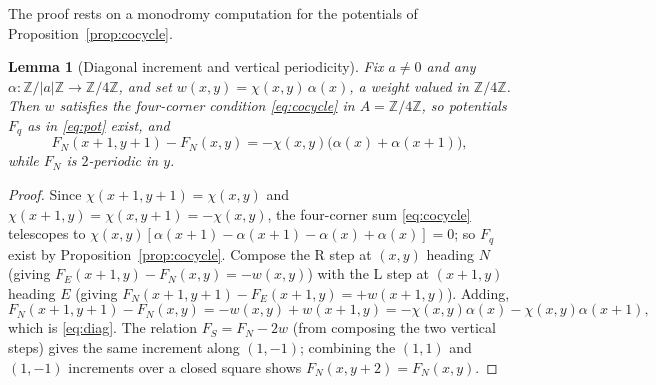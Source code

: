 \documentclass[11pt,reqno]{amsart}
\theoremstyle{plain}
\newtheorem{lemma}[theorem]{Lemma}
\theoremstyle{definition}
\newcommand{\Z}{\mathbb{Z}}
\newcommand{\che}{\chi}
\newcommand{\turnR}{\mathrm{R}}
\newcommand{\turnL}{\mathrm{L}}
\begin{document}
The proof rests on a monodromy computation for the potentials of
Proposition~\ref{prop:cocycle}.

\begin{lemma}[Diagonal increment and vertical periodicity]\label{lem:diag}
Fix $a\neq0$ and any $\alpha:\Z/|a|\Z\to\Z/4\Z$, and set $w(x,y)=\che(x,y)\,\alpha(x)$,
a weight valued in $\Z/4\Z$. Then $w$ satisfies the four-corner condition
\eqref{eq:cocycle} in $A=\Z/4\Z$, so potentials $F_q$ as in
\eqref{eq:pot} exist, and
\begin{equation}\label{eq:diag}
F_N(x{+}1,y{+}1)-F_N(x,y)=-\che(x,y)\bigl(\alpha(x)+\alpha(x{+}1)\bigr),
\end{equation}
while $F_N$ is $2$-periodic in $y$.
\end{lemma}

\begin{proof}
Since $\che(x{+}1,y{+}1)=\che(x,y)$ and $\che(x{+}1,y)=\che(x,y{+}1)=-\che(x,y)$, the
four-corner sum \eqref{eq:cocycle} telescopes to
$\che(x,y)[\alpha(x{+}1)-\alpha(x{+}1)-\alpha(x)+\alpha(x)]=0$;
so $F_q$ exist by Proposition~\ref{prop:cocycle}. Compose the $\turnR$ step at $(x,y)$ heading $N$ (giving
$F_E(x{+}1,y)-F_N(x,y)=-w(x,y)$) with the $\turnL$ step at $(x{+}1,y)$ heading $E$
(giving $F_N(x{+}1,y{+}1)-F_E(x{+}1,y)=+w(x{+}1,y)$). Adding,
\[
F_N(x{+}1,y{+}1)-F_N(x,y)=-w(x,y)+w(x{+}1,y)=-\che(x,y)\alpha(x)-\che(x,y)\alpha(x{+}1),
\]
which is \eqref{eq:diag}. The relation $F_S=F_N-2w$ (from composing the two vertical
steps) gives the same increment along $(1,-1)$; combining the $(1,1)$ and $(1,-1)$
increments over a closed square shows $F_N(x,y{+}2)=F_N(x,y)$.
\end{proof}
\end{document}
